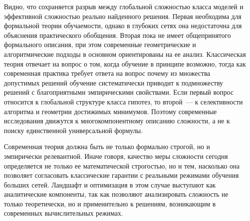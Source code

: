 Видно, что сохраняется разрыв между глобальной сложностью класса моделей и эффективной сложностью реально найденного решения.
Первая необходима для формальной теории обучаемости, однако в глубоких сетях она недостаточна для объяснения практического обобщения.
Вторая пока не имеет общепринятого формального описания, при этом современные геометрические и алгоритмические подходы в основном ориентированы на ее анализ.
Классическая теория отвечает на вопрос о том, когда обучение в принципе возможно, тогда как современная практика требует ответа на вопрос почему из множества допустимых решений обучение систематически приводит к подмножеству решений с благоприятными эмпирическими свойствами.
Если первый вопрос относится к глобальной структуре класса гипотез, то второй~--- к селективности алгоритма и геометрии достижимых минимумов.
Поэтому современные исследования движутся к многокомпонентному описанию сложности, а не к поиску единственной универсальной формулы.

Современная теория должна быть не только формально строгой, но и эмпирически релевантной.
Иначе говоря, качество меры сложности сегодня определяется не только ее математической строгостью, но и тем, насколько она позволяет согласовать классические гарантии с реальными режимами обучения больших сетей.
Ландшафт и оптимизация в этом случае выступают как аналитические компоненты, так как позволяют анализировать сложность не только теоретически, но и применительно к решениям, возникающим в современных вычислительных режимах.

